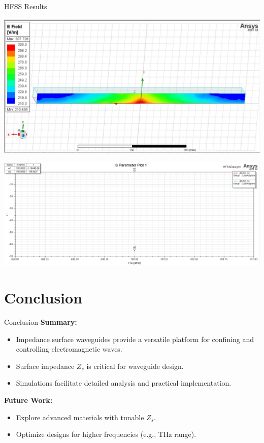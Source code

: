 \documentclass{beamer}
\begin{document}
\begin{frame}{HFSS Results}

        \begin{minipage}{0.48\textwidth}
            \centering
                \includegraphics[width=\textwidth]{Mag_E.jpg}
            \end{minipage}
            \hfill
            \begin{minipage}{0.48\textwidth}
            \centering
                \includegraphics[width=1.2\textwidth]{S11.jpg}
            \end{minipage}

\end{frame}
\section{Conclusion}
\begin{frame}{Conclusion}
    \textbf{Summary:}
    \begin{itemize}
        \item Impedance surface waveguides provide a versatile platform for confining and controlling electromagnetic waves.
        \item Surface impedance \( Z_s \) is critical for waveguide design.
        \item Simulations facilitate detailed analysis and practical implementation.
    \end{itemize}
    
    \textbf{Future Work:}
    \begin{itemize}
        \item Explore advanced materials with tunable \( Z_s \).
        \item Optimize designs for higher frequencies (e.g., THz range).
    \end{itemize}
\end{frame}
\end{document}
